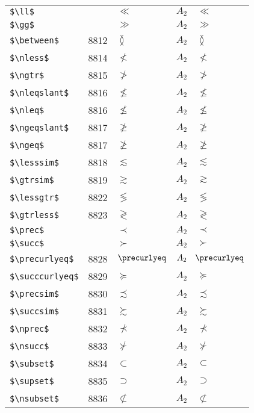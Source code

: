 \documentclass{article}
\begin{document}
\begin{table}
\begin{center}
\begin{tabular}{llll}
 \verb#$\ll$#          &         & $\ll$          & $A_2\quad \ll$\\
 \verb#$\gg$#          &         & $\gg$          & $A_2\quad \gg$\\
 \verb#$\between$#     & 8812    & $\between$     & $A_2\quad \between$\\
 \verb#$\nless$#       & 8814    & $\nless$       & $A_2\quad \nless$\\
 \verb#$\ngtr$#        & 8815    & $\ngtr$        & $A_2\quad \ngtr$\\
 \verb#$\nleqslant$#   & 8816    & $\nleqslant$   & $A_2\quad \nleqslant$\\
 \verb#$\nleq$#        & 8816    & $\nleq$        & $A_2\quad \nleq$\\
 \verb#$\ngeqslant$#   & 8817    & $\ngeqslant$   & $A_2\quad \ngeqslant$\\
 \verb#$\ngeq$#        & 8817    & $\ngeq$        & $A_2\quad \ngeq$\\
 \verb#$\lesssim$#     & 8818    & $\lesssim$     & $A_2\quad \lesssim$\\
 \verb#$\gtrsim$#      & 8819    & $\gtrsim$      & $A_2\quad \gtrsim$\\
 \verb#$\lessgtr$#     & 8822    & $\lessgtr$     & $A_2\quad \lessgtr$\\
 \verb#$\gtrless$#     & 8823    & $\gtrless$     & $A_2\quad \gtrless$\\
 \verb#$\prec$#        &         & $\prec$        & $A_2\quad \prec$\\
 \verb#$\succ$#        &         & $\succ$        & $A_2\quad \succ$\\
 \verb#$\precurlyeq$#  & 8828    & $\precurlyeq$  & $A_2\quad \precurlyeq$\\
 \verb#$\succcurlyeq$# & 8829    & $\succcurlyeq$ & $A_2\quad \succcurlyeq$\\
 \verb#$\precsim$#     & 8830    & $\precsim$     & $A_2\quad \precsim$\\
 \verb#$\succsim$#     & 8831    & $\succsim$     & $A_2\quad \succsim$\\
 \verb#$\nprec$#       & 8832    & $\nprec$       & $A_2\quad \nprec$\\
 \verb#$\nsucc$#       & 8833    & $\nsucc$       & $A_2\quad \nsucc$\\
 \verb#$\subset$#      & 8834    & $\subset$      & $A_2\quad \subset$\\
 \verb#$\supset$#      & 8835    & $\supset$      & $A_2\quad \supset$\\
 \verb#$\nsubset$#     & 8836    & $\nsubset$     & $A_2\quad \nsubset$\\

\end{tabular}
\end{center}
\end{table}
\end{document}
